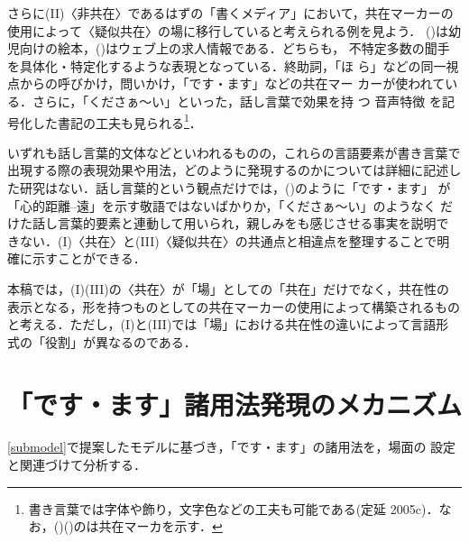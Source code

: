 \documentclass[japanese]{jnlp_1.3c}
\begin{document}
さらに(II)〈非共在〉であるはずの「書くメディア」において，共在マーカーの
使用によって〈疑似共在〉の場に移行していると考えられる例を見よう．
()は幼児向けの絵本，()はウェブ上の求人情報である．どちらも，
不特定多数の聞手を具体化・特定化するような表現となっている．終助詞，「ほ
ら」などの同一視点からの呼びかけ，問いかけ，「です・ます」などの共在マー
カーが使われている．さらに，「くださぁ〜い」といった，話し言葉で効果を持
つ
音声特徴
を記号化した書記の工夫も見られる\footnote{
	書き言葉では字体や飾り，文字色などの工夫も可能である(定延
	2005c)．なお，()()の\unami{　　　}は共在マーカを示す．}．



いずれも話し言葉的文体などといわれるものの，これらの言語要素が書き言葉で
出現する際の表現効果や用法，どのように発現するのかについては詳細に記述し
た研究はない．話し言葉的という観点だけでは，()のように「です・ます」
が「心的距離--遠」を示す敬語ではないばかりか，「くださぁ〜い」のようなく
だけた話し言葉的要素と連動して用いられ，親しみをも感じさせる事実を説明で
きない．(I)〈共在〉と(III)〈疑似共在〉の共通点と相違点を整理することで明
確に示すことができる．

本稿では，(I)(III)の〈共在〉が「場」としての「共在」だけでなく，共在性の
表示となる，形を持つものとしての共在マーカーの使用によって構築されるもの
と考える．ただし，(I)と(III)では「場」における共在性の違いによって言語形
式の「役割」が異なるのである．

\section{「です・ます」諸用法発現のメカニズム}\label{meca}

\ref{submodel}で提案したモデルに基づき，「です・ます」の諸用法を，場面の
設定と関連づけて分析する．
\end{document}
